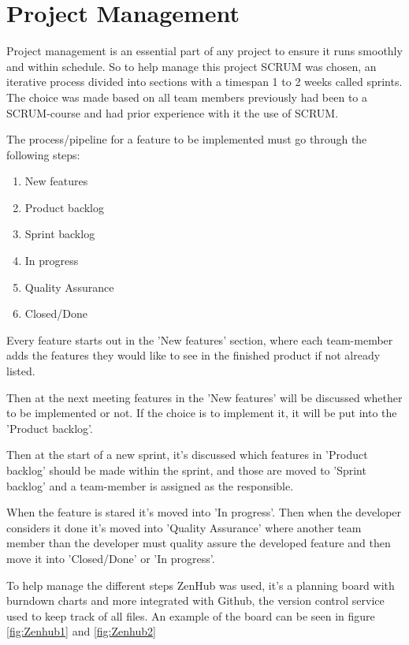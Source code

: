 \chapter{Project Management}

Project management is an essential part of any project to ensure it runs smoothly and within schedule. So to help manage this project SCRUM was chosen, an iterative process divided into sections with a timespan 1 to 2 weeks called sprints.
The choice was made based on all team members previously had been to a SCRUM-course and had prior experience with it the use of SCRUM.

The process/pipeline for a feature to be implemented must go through the following steps:

\begin{enumerate}
	\item New features
	\item Product backlog
	\item Sprint backlog
	\item In progress
	\item Quality Assurance
	\item Closed/Done
\end{enumerate}

Every feature starts out in the 'New features' section, where each team-member adds the features they would like to see in the finished product if not already listed.

Then at the next meeting features in the 'New features' will be discussed whether to be implemented or not. If the choice is to implement it, it will be put into the 'Product backlog'.

Then at the start of a new sprint, it's discussed which features in 'Product backlog' should be made within the sprint, and those are moved to 'Sprint backlog' and a team-member is assigned as the responsible.

When the feature is stared it's moved into 'In progress'. Then when the developer considers it done it's moved into 'Quality Assurance' where another team member than the developer must quality assure the developed feature and then move it into 'Closed/Done' or 'In progress'.

To help manage the different steps ZenHub was used, it's a planning board with burndown charts and more integrated with Github, the version control service used to keep track of all files. An example of the board can be seen in figure \ref{fig:Zenhub1} and \vref{fig:Zenhub2}

